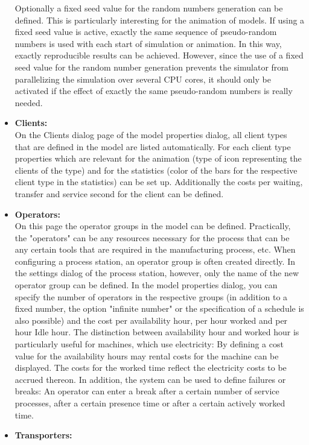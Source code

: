 \documentclass{svmono}
\begin{document}
\begin{itemize}
Optionally a fixed seed value for the random numbers generation can be defined. This is particularly interesting for the animation of models. If using a fixed seed value is active, exactly the same sequence of pseudo-random numbers is used with each start of simulation or animation. In this way, exactly reproducible results can be achieved. However, since the use of a fixed seed value for the random number generation prevents the simulator from parallelizing the simulation over several CPU cores, it should only be activated if the effect of exactly the same pseudo-random numbers is really needed.
\item
\textbf{Clients:}\\
On the Clients dialog page of the model properties dialog, all client types that are defined in the model are listed automatically. For each client type properties which are relevant for the animation (type of icon representing the clients of the type) and for the statistics (color of the bars for the respective client type in the statistics) can be set up. Additionally the costs per waiting, transfer and service second for the client can be defined.
\item
\textbf{Operators:}\\
On this page the operator groups in the model can be defined. Practically, the "operators" can be any resources necessary for the process that can be any certain tools that are required in the manufacturing process, etc. When configuring a process station, an operator group is often created directly. In the settings dialog of the process station, however, only the name of the new operator group can be defined. In the model properties dialog, you can specify the number of operators in the respective groups (in addition to a fixed number, the option "infinite number" or the specification of a schedule is also possible) and the cost per availability hour, per hour worked and per hour Idle hour. The distinction between availability hour and worked hour is particularly useful for machines, which use electricity: By defining a cost value for the availability hours may rental costs for the machine can be displayed. The costs for the worked time reflect the electricity costs to be accrued thereon. In addition, the system can be used to define failures or breaks: An operator can enter a break after a certain number of service processes, after a certain presence time or after a certain actively worked time.
\item
\textbf{Transporters:}\\

\end{itemize}
\end{document}
